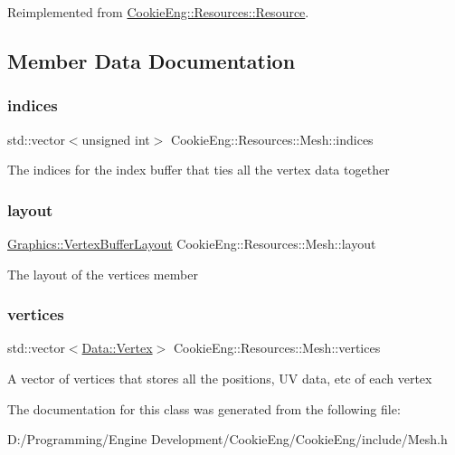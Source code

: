 Reimplemented from \hyperlink{class_cookie_eng_1_1_resources_1_1_resource_a75648b8f2e442bebc90d6eb4ea3a2f6e}{Cookie\+Eng\+::\+Resources\+::\+Resource}.



\subsection{Member Data Documentation}
\mbox{\label{struct_cookie_eng_1_1_resources_1_1_mesh_a78ad4658bc848293472999b4708b85ab}} 
\subsubsection{\texorpdfstring{indices}{indices}}
{\footnotesize\ttfamily std\+::vector$<$unsigned int$>$ Cookie\+Eng\+::\+Resources\+::\+Mesh\+::indices}

The indices for the index buffer that ties all the vertex data together \mbox{\label{struct_cookie_eng_1_1_resources_1_1_mesh_a7d60f959cc5a9cadbc59299e207032f2}} 
\subsubsection{\texorpdfstring{layout}{layout}}
{\footnotesize\ttfamily \hyperlink{class_cookie_eng_1_1_graphics_1_1_vertex_buffer_layout}{Graphics\+::\+Vertex\+Buffer\+Layout} Cookie\+Eng\+::\+Resources\+::\+Mesh\+::layout}

The layout of the vertices member \mbox{\label{struct_cookie_eng_1_1_resources_1_1_mesh_aa2d9365b3bb9855de51053a1bbde84a1}} 
\subsubsection{\texorpdfstring{vertices}{vertices}}
{\footnotesize\ttfamily std\+::vector$<$\hyperlink{struct_cookie_eng_1_1_data_1_1_vertex}{Data\+::\+Vertex}$>$ Cookie\+Eng\+::\+Resources\+::\+Mesh\+::vertices}

A vector of vertices that stores all the positions, UV data, etc of each vertex 

The documentation for this class was generated from the following file\+:\begin{DoxyCompactItemize}
\item 
D\+:/\+Programming/\+Engine Development/\+Cookie\+Eng/\+Cookie\+Eng/include/Mesh.\+h\end{DoxyCompactItemize}
